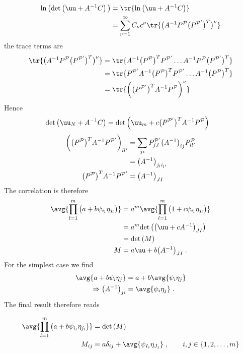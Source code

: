 %
\begin{align*}
\ln\big(\Det{\uu +A^{-1} C}\big) &= \tr{\ln\big( \uu +A^{-1} C \big)}\\
&= \sum_{\nu=1}^{\infty} C_{\nu} c^{\nu} 
\tr{\big( A^{-1} P^{\cP} \big(P^{\cP'}\big)^{T}\big)^{\nu}}
\end{align*}
%
the trace terms are
%
\begin{align*}
\tr{\big( A^{-1} P^{\cP} \big(P^{\cP'}\big)^{T}\big)^{\nu}} &=
\tr{ A^{-1} \big(P^{\cP}\big)^{T}P^{\cP'} \ldots A^{-1} P^{\cP} \big( P^{\cP'}\big)^{T}}\\
&=\tr{ P^{\cP'} A^{-1} \big(P^{\cP}\big)^{T} P^{\cP'} \ldots A^{-1} \big(P^{\cP}\big)^{T}}\\
&=\tr{\bigg(\big(P^{\cP'}\big)^{T}   A^{-1} P^{\cP} \bigg)^{\nu}}
\end{align*}
%
Hence 
%
\begin{align*}
\Det{\uu_{N} + A^{-1}C} &= \Det{\uu_{m} + c \big(P^{\cP'}\big)^{T}   A^{-1} P^{\cP} }
\end{align*}
%
%
\begin{align*}
\bigg(\big(P^{{\cal P}}\big)^{T}   A^{-1} P^{{\cal P}'}\bigg)_{ll'} &=
\sum_{ji}P^{{\cal P}'}_{j,l} \big(A^{-1}\big)_{ij}P^{{\cal P}}_{il'}\\
&= \big(A^{-1}\big)_{j_{l}i_{l'}} \\
\big(P^{{\cal P}}\big)^{T}   A^{-1} P^{{\cal P}'} &= \big(A^{-1}\big)_{JI}
\end{align*}
The correlation is therefore
%
\begin{align}\label{eq:}
\avg{\prod_{l=1}^{m} \big(a + b\psi_{i_{l}} \eta_{j_{l}}\big)}&=
a^{m}\avg{\prod_{l=1}^{m} \big(1 + c\psi_{i_{l}} \eta_{j_{l}}\big)}\\
&=a^{m} \Det{\big(\uu +c A^{-1}\big)_{JI}}\\
&= \Det{M}\\
M&= a \uu + b \big(A^{-1}\big)_{JI}\;.
\end{align}
%
For the simplest case we find
\begin{align}\label{eq:}
\avg{a + b\psi_{i} \eta_{j}} &=a + b\avg{\psi_{i} \eta_{j}} \\
\Rightarrow \big( A^{-1} \big)_{ji} &= \avg{\psi_{i} \eta_{j}} \;.
\end{align}
%
The final result therefore reads
%

\begin{subequations}\label{eq:GV:correlation}
\begin{align}
\avg{\prod_{l=1}^{m} \big(a + b\psi_{i_{l}} \eta_{j_{l}}\big)}&=\Det{M}\\
M_{ij} &= a \delta_{ij}  + \avg{\psi_{I_{i}} \eta_{J_{j}}}\;,
\qquad  i,j \in \{1,2,\ldots,m\}
\end{align}
\end{subequations}


